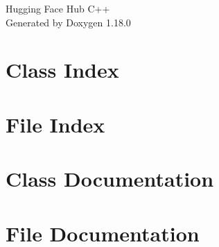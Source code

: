 \documentclass[twoside]{book}
\newcommand{\+}{\discretionary{\mbox{\scriptsize$\hookleftarrow$}}{}{}}
\newcommand{\clearemptydoublepage}{%
    \newpage{\pagestyle{empty}\cleardoublepage}%
  }
\begin{document}
  \raggedbottom
    \hypersetup{pageanchor=false,
                bookmarksnumbered=true,
                pdfencoding=unicode
               }
  \begin{titlepage}
  \vspace*{7cm}
  \begin{center}%
  {\Large Hugging Face Hub C++}\\
  \vspace*{1cm}
  {\large Generated by Doxygen 1.18.0}\\
  \end{center}
  \end{titlepage}
  \clearemptydoublepage
  \tableofcontents
  \clearemptydoublepage
  \hypersetup{pageanchor=true}

\chapter{Class Index}

\chapter{File Index}

\chapter{Class Documentation}



\chapter{File Documentation}


  \backmatter
  \newpage
  \clearemptydoublepage
  \printindex
\end{document}
